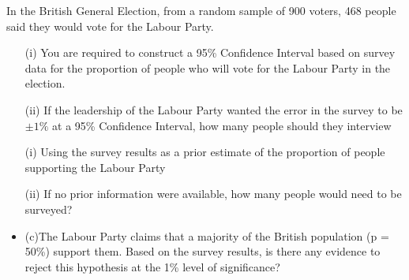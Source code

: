 \documentclass[a4paper,12pt]{article}
\begin{document}

\item
In the British General Election, from a random sample of 900 voters, 468 people said they would vote for the Labour Party.  
\begin{itemize}
	\item[(i)] You are required to construct a 95\% Confidence Interval based on survey data for the proportion of people who will vote for the Labour Party in the election.
	
\item[(ii)]If the leadership of the Labour Party wanted the error in the survey to be $\pm 1\%$ at a 95\% Confidence Interval, how many people should they interview
	
\end{itemize}

\begin{itemize}
	\item[(i)]Using the survey results as a prior estimate of the proportion of people supporting the Labour Party
	\item[(ii)]If no prior information were available, how many people would need to be surveyed?
\item (c)The Labour Party claims that a majority of the British population (p = 50\%) support them.  Based on the survey results, is there any evidence to reject this hypothesis at the 1\% level of significance? 

\end{itemize}
\end{document}
